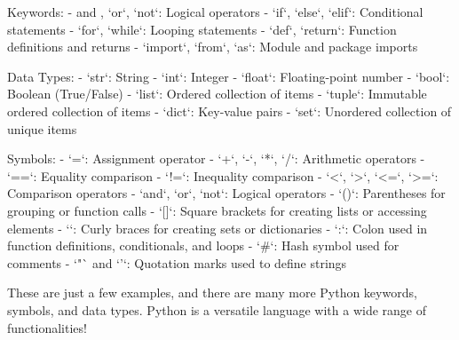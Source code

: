 Keywords:
-  and , `or`, `not`: Logical operators
- `if`, `else`, `elif`: Conditional statements
- `for`, `while`: Looping statements
- `def`, `return`: Function definitions and returns
- `import`, `from`, `as`: Module and package imports

Data Types:
- `str`: String
- `int`: Integer
- `float`: Floating-point number
- `bool`: Boolean (True/False)
- `list`: Ordered collection of items
- `tuple`: Immutable ordered collection of items
- `dict`: Key-value pairs
- `set`: Unordered collection of unique items

Symbols:
- `=`: Assignment operator
- `+`, `-`, `*`, `/`: Arithmetic operators
- `==`: Equality comparison
- `!=`: Inequality comparison
- `<`, `>`, `<=`, `>=`: Comparison operators
- `and`, `or`, `not`: Logical operators
- `()`: Parentheses for grouping or function calls
- `[]`: Square brackets for creating lists or accessing elements
- `{}`: Curly braces for creating sets or dictionaries
- `:`: Colon used in function definitions, conditionals, and loops
- `#`: Hash symbol used for comments
- `"` and `'`: Quotation marks used to define strings

These are just a few examples, and there are many more Python keywords, symbols, and data types.
Python is a versatile language with a wide range of functionalities!